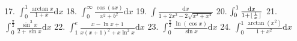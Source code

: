 \documentclass{article}
\DeclarePairedDelimiter{\floor}{\lfloor}{\rfloor}
\newcommand{\dd}{\mathrm{d}}
\begin{document}
\begin{flushleft}
17. $\int_0^1 \frac{\arctan{x}}{1+x} \dd x$ \newline  \newline \newline 
18. $\int_0^{\infty} \frac{\cos(ax)}{x^2+b^2} \dd x$  \newline  \newline \newline 
19. $\int \frac{\dd x}{1+2x^2-2\sqrt{x^2+x^4}}$ \newline  \newline \newline 
20. $\int_0^1 \frac{\dd x}{1+\floor{\frac{1}{x}}}$ \newline  \newline \newline 
21. $\int_0^{\frac{\pi}{2}} \frac{\sin^3{x}}{2+\sin{x}} \dd x$ \newline  \newline \newline 
22. $\int_1^e \frac{x-\ln{x}+1}{x(x+1)^2+x\ln^2{x}} \dd x$ \newline  \newline \newline 
23. $\int_0^{\frac{\pi}{2}} \frac{\ln(\cos{x})}{\sin{x}} \dd x$ \newline  \newline \newline 
24. $\int_0^1 \frac{\arctan(x^2)}{1+x^2} \dd x$ \newline  \newline \newline 


\end{flushleft}
\end{document}
